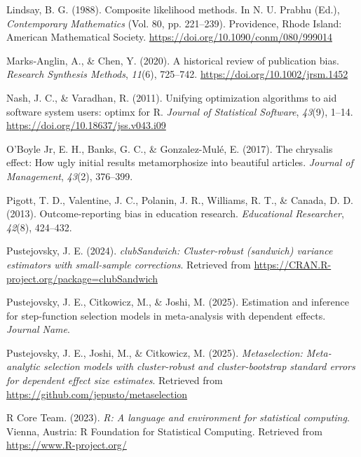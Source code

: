 \documentclass[
  man, donotrepeattitle,floatsintext]{apa7}
\newlength{\cslhangindent}
\newenvironment{CSLReferences}[2] %
 {\begin{list}{}{%
  \setlength{\itemindent}{0pt}
  \setlength{\leftmargin}{0pt}
  \setlength{\parsep}{0pt}
  \ifodd #1
   \setlength{\leftmargin}{\cslhangindent}
   \setlength{\itemindent}{-1\cslhangindent}
  \fi
  \setlength{\itemsep}{#2\baselineskip}}}
 {\end{list}}
\begin{document}
\begin{CSLReferences}{1}{0}
Lindsay, B. G. (1988). Composite likelihood methods. In N. U. Prabhu (Ed.), \emph{Contemporary {Mathematics}} (Vol. 80, pp. 221--239). Providence, Rhode Island: American Mathematical Society. \url{https://doi.org/10.1090/conm/080/999014}

Marks‐Anglin, A., \& Chen, Y. (2020). A historical review of publication bias. \emph{Research Synthesis Methods}, \emph{11}(6), 725--742. \url{https://doi.org/10.1002/jrsm.1452}

Nash, J. C., \& Varadhan, R. (2011). Unifying optimization algorithms to aid software system users: {optimx} for {R}. \emph{Journal of Statistical Software}, \emph{43}(9), 1--14. \url{https://doi.org/10.18637/jss.v043.i09}

O'Boyle Jr, E. H., Banks, G. C., \& Gonzalez-Mulé, E. (2017). The chrysalis effect: How ugly initial results metamorphosize into beautiful articles. \emph{Journal of Management}, \emph{43}(2), 376--399.

Pigott, T. D., Valentine, J. C., Polanin, J. R., Williams, R. T., \& Canada, D. D. (2013). Outcome-reporting bias in education research. \emph{Educational Researcher}, \emph{42}(8), 424--432.

Pustejovsky, J. E. (2024). \emph{clubSandwich: Cluster-robust (sandwich) variance estimators with small-sample corrections}. Retrieved from \url{https://CRAN.R-project.org/package=clubSandwich}

Pustejovsky, J. E., Citkowicz, M., \& Joshi, M. (2025). Estimation and inference for step-function selection models in meta-analysis with dependent effects. \emph{Journal Name}.

Pustejovsky, J. E., Joshi, M., \& Citkowicz, M. (2025). \emph{Metaselection: Meta-analytic selection models with cluster-robust and cluster-bootstrap standard errors for dependent effect size estimates}. Retrieved from \url{https://github.com/jepusto/metaselection}

R Core Team. (2023). \emph{R: A language and environment for statistical computing}. Vienna, Austria: R Foundation for Statistical Computing. Retrieved from \url{https://www.R-project.org/}


\end{CSLReferences}
\end{document}

